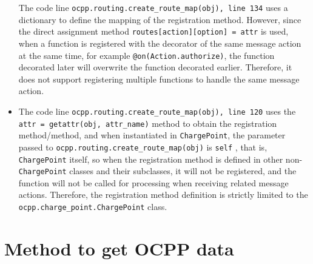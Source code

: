 \documentclass[
english,
ruledheaders=section,%
class=report,%
thesis={type=Report},%
accentcolor=9c,%
custommargins=true,%
marginpar=false,%
parskip=half-,%
fontsize=11pt,%
logofile={img/tuda_logo.pdf}, %
]{tudapub}
\begin{document}
\begin{itemize}
        The code line \texttt{ocpp.routing.create\_route\_map(obj), line 134} uses a dictionary to define the mapping of the registration method. However, since the direct assignment method \texttt{routes[action][option] = attr} is used, when a function is registered with the decorator of the same message action at the same time, for example \texttt{@on(Action.authorize)}, the function decorated later will overwrite the function decorated earlier. Therefore, it does not support registering multiple functions to handle the same message action.


        \item The code line \texttt{ocpp.routing.create\_route\_map(obj), line 120} uses the \texttt{attr = getattr(obj, attr\_name)} method to obtain the registration method/method, and when instantiated in \texttt{ChargePoint}, the parameter passed to \texttt{ocpp.routing.create\_route\_map(obj)} is \texttt{self} , that is, \texttt{ChargePoint} itself, so when the registration method is defined in other non-\texttt{ChargePoint} classes and their subclasses, it will not be registered, and the function will not be called for processing when receiving related message actions. Therefore, the registration method definition is strictly limited to the \texttt{ocpp.charge\_point.ChargePoint} class.
    \end{itemize}

    \section{Method to get OCPP data}
    \label{sec:ocppSendReceive}
\end{document}
